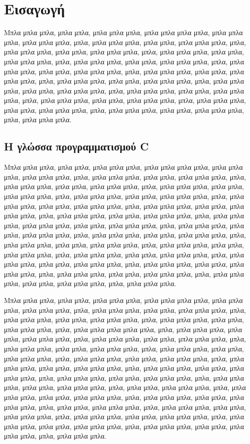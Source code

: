 \chapter{Εισαγωγή}

Μπλα μπλα μπλα, μπλα μπλα, μπλα μπλα μπλα, μπλα μπλα μπλα μπλα,
μπλα μπλα μπλα, μπλα μπλα μπλα, μπλα, μπλα μπλα μπλα, μπλα μπλα,
μπλα μπλα μπλα, μπλα, μπλα μπλα μπλα, μπλα μπλα, μπλα μπλα μπλα,
μπλα, μπλα μπλα μπλα, μπλα μπλα, μπλα μπλα μπλα, μπλα, μπλα μπλα
μπλα, μπλα μπλα, μπλα μπλα μπλα, μπλα, μπλα μπλα μπλα, μπλα μπλα,
μπλα μπλα μπλα, μπλα, μπλα μπλα μπλα, μπλα μπλα, μπλα μπλα μπλα,
μπλα, μπλα μπλα μπλα, μπλα μπλα, μπλα μπλα μπλα, μπλα, μπλα μπλα
μπλα, μπλα μπλα, μπλα μπλα μπλα, μπλα, μπλα μπλα μπλα, μπλα μπλα,
μπλα μπλα μπλα, μπλα, μπλα μπλα μπλα, μπλα μπλα, μπλα μπλα μπλα,
μπλα, μπλα μπλα μπλα, μπλα μπλα, μπλα μπλα μπλα, μπλα, μπλα μπλα
μπλα, μπλα μπλα, μπλα μπλα μπλα, μπλα, μπλα μπλα μπλα.


\section{Η γλώσσα προγραμματισμού C}

Μπλα μπλα μπλα, μπλα μπλα, μπλα μπλα μπλα, μπλα μπλα μπλα μπλα,
μπλα μπλα μπλα, μπλα μπλα μπλα, μπλα, μπλα μπλα μπλα, μπλα μπλα,
μπλα μπλα μπλα, μπλα, μπλα μπλα μπλα, μπλα μπλα, μπλα μπλα μπλα,
μπλα, μπλα μπλα μπλα, μπλα μπλα, μπλα μπλα μπλα, μπλα, μπλα μπλα
μπλα, μπλα μπλα, μπλα μπλα μπλα, μπλα, μπλα μπλα μπλα, μπλα μπλα,
μπλα μπλα μπλα, μπλα, μπλα μπλα μπλα, μπλα μπλα, μπλα μπλα μπλα,
μπλα, μπλα μπλα μπλα, μπλα μπλα, μπλα μπλα μπλα, μπλα, μπλα μπλα
μπλα, μπλα μπλα μπλα, μπλα μπλα, μπλα μπλα μπλα, μπλα, μπλα μπλα
μπλα, μπλα μπλα, μπλα μπλα μπλα, μπλα, μπλα μπλα μπλα, μπλα μπλα,
μπλα μπλα μπλα, μπλα, μπλα μπλα μπλα, μπλα μπλα, μπλα μπλα μπλα,
μπλα, μπλα μπλα μπλα, μπλα μπλα, μπλα μπλα μπλα, μπλα, μπλα μπλα
μπλα, μπλα μπλα, μπλα μπλα μπλα, μπλα, μπλα μπλα μπλα, μπλα μπλα,
μπλα μπλα μπλα, μπλα, μπλα μπλα μπλα, μπλα μπλα, μπλα μπλα μπλα,
μπλα, μπλα μπλα μπλα, μπλα μπλα, μπλα μπλα μπλα, μπλα, μπλα μπλα
μπλα, μπλα μπλα, μπλα μπλα μπλα, μπλα, μπλα μπλα μπλα.

Μπλα μπλα μπλα, μπλα μπλα, μπλα μπλα μπλα, μπλα μπλα μπλα μπλα,
μπλα μπλα μπλα, μπλα μπλα μπλα, μπλα, μπλα μπλα μπλα, μπλα μπλα,
μπλα μπλα μπλα, μπλα, μπλα μπλα μπλα, μπλα μπλα, μπλα μπλα μπλα,
μπλα, μπλα μπλα μπλα, μπλα μπλα, μπλα μπλα μπλα, μπλα, μπλα μπλα
μπλα μπλα μπλα, μπλα, μπλα μπλα μπλα, μπλα μπλα, μπλα μπλα μπλα,
μπλα, μπλα μπλα μπλα, μπλα μπλα, μπλα μπλα μπλα, μπλα, μπλα μπλα
μπλα, μπλα μπλα, μπλα μπλα μπλα, μπλα, μπλα μπλα μπλα, μπλα μπλα,
μπλα μπλα μπλα, μπλα, μπλα μπλα μπλα, μπλα μπλα, μπλα μπλα μπλα,
μπλα, μπλα μπλα μπλα, μπλα μπλα, μπλα μπλα μπλα, μπλα, μπλα μπλα
μπλα, μπλα μπλα, μπλα μπλα μπλα, μπλα, μπλα μπλα μπλα, μπλα μπλα,
μπλα μπλα μπλα, μπλα, μπλα μπλα μπλα, μπλα μπλα, μπλα μπλα μπλα,
μπλα, μπλα μπλα, μπλα μπλα μπλα, μπλα, μπλα μπλα μπλα, μπλα μπλα,
μπλα μπλα μπλα, μπλα, μπλα μπλα μπλα, μπλα μπλα, μπλα μπλα μπλα,
μπλα, μπλα μπλα, μπλα μπλα μπλα, μπλα, μπλα μπλα μπλα, μπλα μπλα,
μπλα μπλα μπλα, μπλα, μπλα μπλα μπλα, μπλα μπλα, μπλα μπλα μπλα,
μπλα, μπλα μπλα μπλα, μπλα μπλα, μπλα μπλα μπλα, μπλα, μπλα μπλα
μπλα, μπλα μπλα, μπλα μπλα μπλα, μπλα, μπλα μπλα μπλα.

